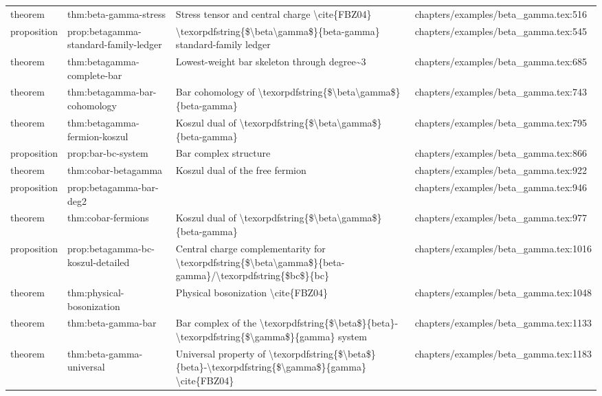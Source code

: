 \documentclass[11pt]{article}
\begin{document}
\begin{longtable}{L{0.10\textwidth}L{0.26\textwidth}L{0.42\textwidth}L{0.22\textwidth}}
theorem & thm:beta-gamma-stress & Stress tensor and central charge \textbackslash{}cite\{FBZ04\} & chapters/examples/beta\_gamma.tex:516\\
proposition & prop:betagamma-standard-family-led{}ger & \textbackslash{}texorpdfstring\{\$\textbackslash{}beta\textbackslash{}gamma\$\}\{beta-gamma\} standard-family led{}ger & chapters/examples/beta\_gamma.tex:545\\
theorem & thm:betagamma-complete-bar & Lowest-weight bar skeleton through degree\textasciitilde{}3 & chapters/examples/beta\_gamma.tex:685\\
theorem & thm:betagamma-bar-cohomology & Bar cohomology of \textbackslash{}texorpdfstring\{\$\textbackslash{}beta\textbackslash{}gamma\$\}\{beta-gamma\} & chapters/examples/beta\_gamma.tex:743\\
theorem & thm:betagamma-fermion-koszul & Koszul dual of \textbackslash{}texorpdfstring\{\$\textbackslash{}beta\textbackslash{}gamma\$\}\{beta-gamma\} & chapters/examples/beta\_gamma.tex:795\\
proposition & prop:bar-bc-system & Bar complex structure & chapters/examples/beta\_gamma.tex:866\\
theorem & thm:cobar-betagamma & Koszul dual of the free fermion & chapters/examples/beta\_gamma.tex:922\\
proposition & prop:betagamma-bar-deg2 &  & chapters/examples/beta\_gamma.tex:946\\
theorem & thm:cobar-fermions & Koszul dual of \textbackslash{}texorpdfstring\{\$\textbackslash{}beta\textbackslash{}gamma\$\}\{beta-gamma\} & chapters/examples/beta\_gamma.tex:977\\
proposition & prop:betagamma-bc-koszul-detailed & Central charge complementarity for \textbackslash{}texorpdfstring\{\$\textbackslash{}beta\textbackslash{}gamma\$\}\{beta-gamma\}/\textbackslash{}texorpdfstring\{\$bc\$\}\{bc\} & chapters/examples/beta\_gamma.tex:1016\\
theorem & thm:physical-bosonization & Physical bosonization \textbackslash{}cite\{FBZ04\} & chapters/examples/beta\_gamma.tex:1048\\
theorem & thm:beta-gamma-bar & Bar complex of the \textbackslash{}texorpdfstring\{\$\textbackslash{}beta\$\}\{beta\}-\textbackslash{}texorpdfstring\{\$\textbackslash{}gamma\$\}\{gamma\} system & chapters/examples/beta\_gamma.tex:1133\\
theorem & thm:beta-gamma-universal & Universal property of \textbackslash{}texorpdfstring\{\$\textbackslash{}beta\$\}\{beta\}-\textbackslash{}texorpdfstring\{\$\textbackslash{}gamma\$\}\{gamma\} \textbackslash{}cite\{FBZ04\} & chapters/examples/beta\_gamma.tex:1183\\

\end{longtable}
\end{document}
